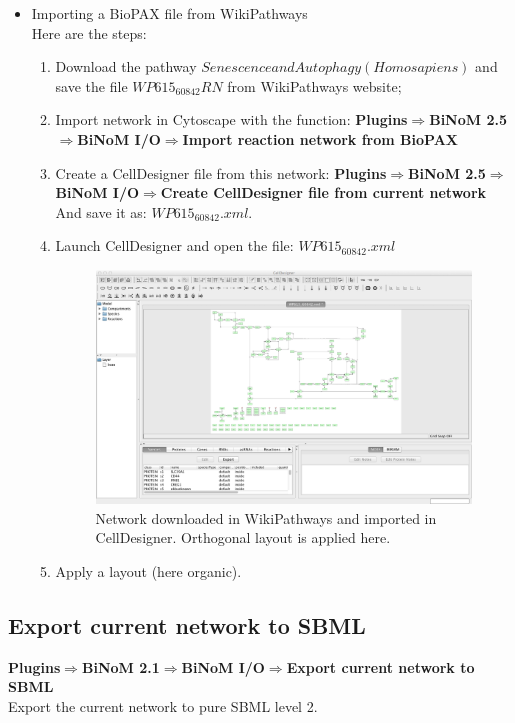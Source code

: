 \begin{itemize}
\item Importing a BioPAX file from WikiPathways \\
Here are the steps: 
\begin{enumerate}
\item Download the pathway $Senescence and Autophagy (Homo sapiens)$ and save the file $WP615_60842 RN$ from WikiPathways website; 
\item Import network in Cytoscape with the function: 
\textbf{Plugins$\Rightarrow$BiNoM 2.5$\Rightarrow$BiNoM I/O$\Rightarrow$Import reaction network from BioPAX}
\item Create a CellDesigner file from this network:
\textbf{Plugins$\Rightarrow$BiNoM 2.5$\Rightarrow$BiNoM I/O$\Rightarrow$Create CellDesigner file from current network}\\
And save it as: $WP615_60842.xml$.
\item Launch CellDesigner and open the file: $WP615_60842.xml$
\begin{figure}
\includegraphics[width=1\textwidth]{graphics/wikipathways_CD.png}
\caption{Network downloaded in WikiPathways and imported in CellDesigner. Orthogonal layout is applied here.}
\label{import_CD}
\end{figure}
\item Apply a layout (here organic).
\end{enumerate}

\end{itemize}

\subsection{Export current network to SBML}
\textbf{Plugins$\Rightarrow$BiNoM 2.1$\Rightarrow$BiNoM I/O$\Rightarrow$Export current network to SBML}\\
Export the current network to pure SBML level 2.



